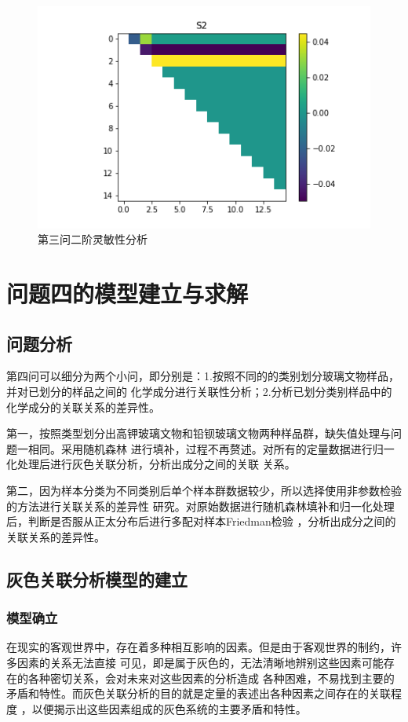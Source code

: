 \documentclass[UTF8]{ctexart}
\begin{document}
\begin{figure}[H]\centering
	\includegraphics[width=1\textwidth,height=0.6\textwidth]{img/S2_heatmap2.png} %
	\caption{第三问二阶灵敏性分析} %
	\label{fig:figure 9} %
\end{figure}






\section{问题四的模型建立与求解}
\subsection{问题分析}
第四问可以细分为两个小问，即分别是：1.按照不同的的类别划分玻璃文物样品，并对已划分的样品之间的
化学成分进行关联性分析；2.分析已划分类别样品中的化学成分的关联关系的差异性。

第一，按照类型划分出高钾玻璃文物和铅钡玻璃文物两种样品群，缺失值处理与问题一相同。采用随机森林
进行填补，过程不再赘述。对所有的定量数据进行归一化处理后进行灰色关联分析，分析出成分之间的关联
关系。

第二，因为样本分类为不同类别后单个样本群数据较少，所以选择使用非参数检验的方法进行关联关系的差异性
研究。对原始数据进行随机森林填补和归一化处理后，判断是否服从正太分布后进行多配对样本Friedman检验
，分析出成分之间的关联关系的差异性。

\subsection{灰色关联分析模型的建立}
\subsubsection{模型确立}
在现实的客观世界中，存在着多种相互影响的因素。但是由于客观世界的制约，许多因素的关系无法直接
可见，即是属于灰色的，无法清晰地辨别这些因素可能存在的各种密切关系，会对未来对这些因素的分析造成
各种困难，不易找到主要的矛盾和特性。而灰色关联分析的目的就是定量的表述出各种因素之间存在的关联程度
，以便揭示出这些因素组成的灰色系统的主要矛盾和特性。
\end{document}
